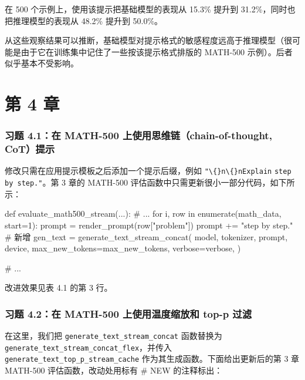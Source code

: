 在 500 个示例上，使用该提示把基础模型的表现从 15.3\% 提升到 31.2\%，同时也把推理模型的表现从 48.2\% 提升到 50.0\%。

从这些观察结果可以推断，基础模型对提示格式的敏感程度远高于推理模型（很可能是由于它在训练集中记住了一些按该提示格式排版的 MATH-500 示例）。后者似乎基本不受影响。

\section{第 4 章}

\subsubsection*{习题 4.1：在 MATH-500 上使用思维链（chain-of-thought, CoT）提示}

修改只需在应用提示模板之后添加一个提示后缀，例如 \texttt{"}\texttt{\textbackslash\{\}n\textbackslash\{\}nExplain} \texttt{step} \texttt{by step.}\texttt{"}。第 3 章的 MATH-500 评估函数中只需更新很小一部分代码，如下所示：

\begin{codebox}
def evaluate_math500_stream(...):
    # ...
        for i, row in enumerate(math_data, start=1):
            prompt = render_prompt(row["problem"])
            prompt += "\n\nExplain step by step."  # 新增
            gen_text = generate_text_stream_concat(
                model, tokenizer, prompt, device,
                max_new_tokens=max_new_tokens,
                verbose=verbose,
            )

     # ...
\end{codebox}

改进效果见表 4.1 的第 3 行。

\subsubsection*{习题 4.2：在 MATH-500 上使用温度缩放和 top-p 过滤}

在这里，我们把 \texttt{generate\_text\_stream\_concat} 函数替换为 \texttt{generate\_text\_stream\_concat\_flex}，并传入 \texttt{generate\_text\_top\_p\_stream\_cache} 作为其生成函数。下面给出更新后的第 3 章 MATH-500 评估函数，改动处用标有 \# NEW 的注释标出：

